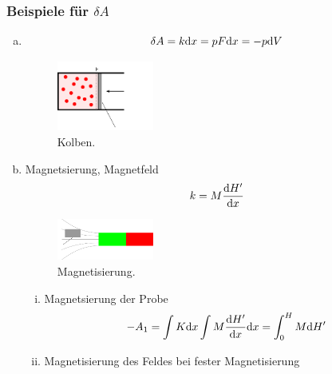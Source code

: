\subsubsection{Beispiele für $\delta A$}
\begin{enumerate}[a)]
    \item
    \begin{equation}
        \delta A = k \mathrm{d} x = p F \mathrm{d} x = - p \mathrm{d} V
    \end{equation}
    \begin{figure}[H]
        \begin{center}
            \includegraphics[width=0.3\textwidth]{../img/exampleDApiston.pdf}
            \caption{Kolben.}  %
            \label{img:exampleDApiston}
        \end{center}
    \end{figure}
    \item Magnetsierung, Magnetfeld
    \begin{equation}
        k = M \frac{\mathrm{d} H'}{\mathrm{d} x}
    \end{equation}
    \begin{figure}[H]
        \begin{center}
            \includegraphics[width=0.3\textwidth]{../img/exampleDAmagnetism.pdf}
            \caption{Magnetisierung.}  %
            \label{img:exampleDAmagnetism}
        \end{center}
    \end{figure}
    \begin{enumerate}[i)]
        \item Magnetsierung der Probe
        \begin{equation}
            -A_1 = \int K \mathrm{d} x \int M \frac{\mathrm{d} H'}{\mathrm{d} x} \mathrm{d} x = \int_{0}^{H} M \mathrm{d} H'
        \end{equation}
        \item Magnetisierung des Feldes bei fester Magnetisierung
        \begin{equation}

\end{equation}
\end{enumerate}
\end{enumerate}
